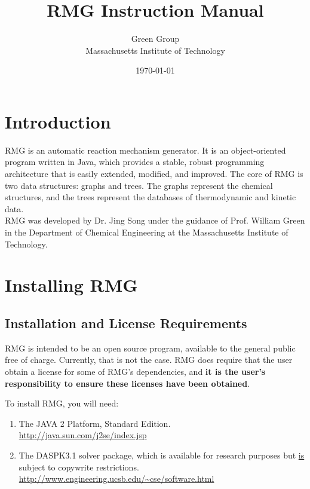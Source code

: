 \documentclass[12pt,letterpaper]{article}
\begin{document}
\title{RMG Instruction Manual}
\author{Green Group \\ Massachusetts Institute of Technology}
\date{\today}
\maketitle
{}

\newpage

\tableofcontents
\setcounter{tocdepth}{4}

\newpage
\setcounter{page}{0}

\section{Introduction}
RMG is an automatic reaction mechanism generator. It is an object-oriented
program written in Java, which provides a stable, robust programming architecture
that is easily extended, modified, and improved. The core of RMG
is two data structures: graphs and trees. The graphs represent the chemical
structures, and the trees represent the databases of thermodynamic and
kinetic data.\\

RMG was developed by Dr. Jing Song under the guidance of Prof.
William Green in the Department of Chemical Engineering at the Massachusetts
Institute of Technology.
\section{Installing RMG}

\subsection{Installation and License Requirements} \label{install requirements}
RMG is intended to be an open source program, available to the general
public free of charge. Currently, that is not the case. RMG does require
that the user obtain a license for some of RMG's dependencies, and \textbf{it is the
user's responsibility to ensure these licenses have been obtained}.

To install RMG, you will need:

\begin{enumerate}
\item The JAVA 2 Platform, Standard Edition. \\ \url{http://java.sun.com/j2se/index.jsp}
\item The DASPK3.1 solver package, which is available for research purposes but \underline{is} subject to copywrite restrictions. \\ \url{http://www.engineering.ucsb.edu/~cse/software.html}
\end{enumerate}
\end{document}
